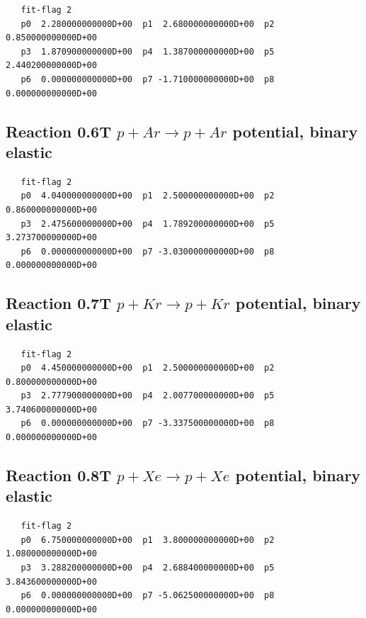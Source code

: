 \documentclass[12pt,dvips]{article}
\begin{document}
\begin{small}\begin{verbatim}
   fit-flag 2
   p0  2.280000000000D+00  p1  2.680000000000D+00  p2  0.850000000000D+00
   p3  1.870900000000D+00  p4  1.387000000000D+00  p5  2.440200000000D+00
   p6  0.000000000000D+00  p7 -1.710000000000D+00  p8  0.000000000000D+00
\end{verbatim}\end{small}


\newpage

\subsection{
Reaction 0.6T   $ p + Ar \rightarrow p + Ar $ potential, binary elastic }

\begin{small}\begin{verbatim}
   fit-flag 2
   p0  4.040000000000D+00  p1  2.500000000000D+00  p2  0.860000000000D+00
   p3  2.475600000000D+00  p4  1.789200000000D+00  p5  3.273700000000D+00
   p6  0.000000000000D+00  p7 -3.030000000000D+00  p8  0.000000000000D+00
\end{verbatim}\end{small}


\newpage

\subsection{
Reaction 0.7T   $ p + Kr \rightarrow p + Kr $ potential, binary elastic }

\begin{small}\begin{verbatim}
   fit-flag 2
   p0  4.450000000000D+00  p1  2.500000000000D+00  p2  0.800000000000D+00
   p3  2.777900000000D+00  p4  2.007700000000D+00  p5  3.740600000000D+00
   p6  0.000000000000D+00  p7 -3.337500000000D+00  p8  0.000000000000D+00
\end{verbatim}\end{small}


\newpage

\subsection{
Reaction 0.8T   $ p + Xe \rightarrow p + Xe $ potential, binary elastic }

\begin{small}\begin{verbatim}
   fit-flag 2
   p0  6.750000000000D+00  p1  3.800000000000D+00  p2  1.080000000000D+00
   p3  3.288200000000D+00  p4  2.688400000000D+00  p5  3.843600000000D+00
   p6  0.000000000000D+00  p7 -5.062500000000D+00  p8  0.000000000000D+00
\end{verbatim}\end{small}
\end{document}

